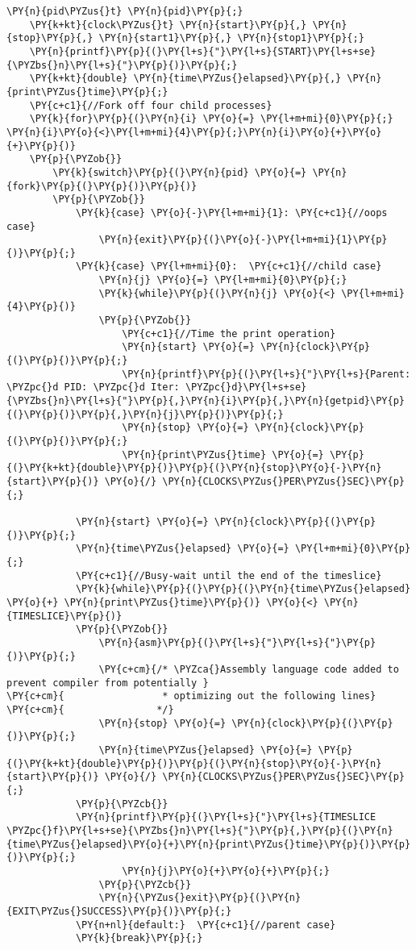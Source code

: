 \begin{Verbatim}[commandchars=\\\{\}]
    \PY{n}{pid\PYZus{}t} \PY{n}{pid}\PY{p}{;}
    \PY{k+kt}{clock\PYZus{}t} \PY{n}{start}\PY{p}{,} \PY{n}{stop}\PY{p}{,} \PY{n}{start1}\PY{p}{,} \PY{n}{stop1}\PY{p}{;}
    \PY{n}{printf}\PY{p}{(}\PY{l+s}{"}\PY{l+s}{START}\PY{l+s+se}{\PYZbs{}n}\PY{l+s}{"}\PY{p}{)}\PY{p}{;}
    \PY{k+kt}{double} \PY{n}{time\PYZus{}elapsed}\PY{p}{,} \PY{n}{print\PYZus{}time}\PY{p}{;}
    \PY{c+c1}{//Fork off four child processes}
    \PY{k}{for}\PY{p}{(}\PY{n}{i} \PY{o}{=} \PY{l+m+mi}{0}\PY{p}{;} \PY{n}{i}\PY{o}{<}\PY{l+m+mi}{4}\PY{p}{;}\PY{n}{i}\PY{o}{+}\PY{o}{+}\PY{p}{)}
    \PY{p}{\PYZob{}}
        \PY{k}{switch}\PY{p}{(}\PY{n}{pid} \PY{o}{=} \PY{n}{fork}\PY{p}{(}\PY{p}{)}\PY{p}{)}
        \PY{p}{\PYZob{}}
            \PY{k}{case} \PY{o}{-}\PY{l+m+mi}{1}: \PY{c+c1}{//oops case}
                \PY{n}{exit}\PY{p}{(}\PY{o}{-}\PY{l+m+mi}{1}\PY{p}{)}\PY{p}{;}
            \PY{k}{case} \PY{l+m+mi}{0}:  \PY{c+c1}{//child case}
                \PY{n}{j} \PY{o}{=} \PY{l+m+mi}{0}\PY{p}{;}
                \PY{k}{while}\PY{p}{(}\PY{n}{j} \PY{o}{<} \PY{l+m+mi}{4}\PY{p}{)}
                \PY{p}{\PYZob{}}
                    \PY{c+c1}{//Time the print operation}
                    \PY{n}{start} \PY{o}{=} \PY{n}{clock}\PY{p}{(}\PY{p}{)}\PY{p}{;}
                    \PY{n}{printf}\PY{p}{(}\PY{l+s}{"}\PY{l+s}{Parent: \PYZpc{}d PID: \PYZpc{}d Iter: \PYZpc{}d}\PY{l+s+se}{\PYZbs{}n}\PY{l+s}{"}\PY{p}{,}\PY{n}{i}\PY{p}{,}\PY{n}{getpid}\PY{p}{(}\PY{p}{)}\PY{p}{,}\PY{n}{j}\PY{p}{)}\PY{p}{;}
                    \PY{n}{stop} \PY{o}{=} \PY{n}{clock}\PY{p}{(}\PY{p}{)}\PY{p}{;}
                    \PY{n}{print\PYZus{}time} \PY{o}{=} \PY{p}{(}\PY{k+kt}{double}\PY{p}{)}\PY{p}{(}\PY{n}{stop}\PY{o}{-}\PY{n}{start}\PY{p}{)} \PY{o}{/} \PY{n}{CLOCKS\PYZus{}PER\PYZus{}SEC}\PY{p}{;}

            \PY{n}{start} \PY{o}{=} \PY{n}{clock}\PY{p}{(}\PY{p}{)}\PY{p}{;}
            \PY{n}{time\PYZus{}elapsed} \PY{o}{=} \PY{l+m+mi}{0}\PY{p}{;}
            \PY{c+c1}{//Busy-wait until the end of the timeslice}
            \PY{k}{while}\PY{p}{(}\PY{p}{(}\PY{n}{time\PYZus{}elapsed} \PY{o}{+} \PY{n}{print\PYZus{}time}\PY{p}{)} \PY{o}{<} \PY{n}{TIMESLICE}\PY{p}{)}
            \PY{p}{\PYZob{}}
                \PY{n}{asm}\PY{p}{(}\PY{l+s}{"}\PY{l+s}{"}\PY{p}{)}\PY{p}{;} 
                \PY{c+cm}{/* \PYZca{}Assembly language code added to prevent compiler from potentially }
\PY{c+cm}{                 * optimizing out the following lines}
\PY{c+cm}{                */}
                \PY{n}{stop} \PY{o}{=} \PY{n}{clock}\PY{p}{(}\PY{p}{)}\PY{p}{;}
                \PY{n}{time\PYZus{}elapsed} \PY{o}{=} \PY{p}{(}\PY{k+kt}{double}\PY{p}{)}\PY{p}{(}\PY{n}{stop}\PY{o}{-}\PY{n}{start}\PY{p}{)} \PY{o}{/} \PY{n}{CLOCKS\PYZus{}PER\PYZus{}SEC}\PY{p}{;}
            \PY{p}{\PYZcb{}}
            \PY{n}{printf}\PY{p}{(}\PY{l+s}{"}\PY{l+s}{TIMESLICE \PYZpc{}f}\PY{l+s+se}{\PYZbs{}n}\PY{l+s}{"}\PY{p}{,}\PY{p}{(}\PY{n}{time\PYZus{}elapsed}\PY{o}{+}\PY{n}{print\PYZus{}time}\PY{p}{)}\PY{p}{)}\PY{p}{;}
                    \PY{n}{j}\PY{o}{+}\PY{o}{+}\PY{p}{;}
                \PY{p}{\PYZcb{}}
                \PY{n}{\PYZus{}exit}\PY{p}{(}\PY{n}{EXIT\PYZus{}SUCCESS}\PY{p}{)}\PY{p}{;}
            \PY{n+nl}{default:}  \PY{c+c1}{//parent case}
            \PY{k}{break}\PY{p}{;}


\end{Verbatim}
